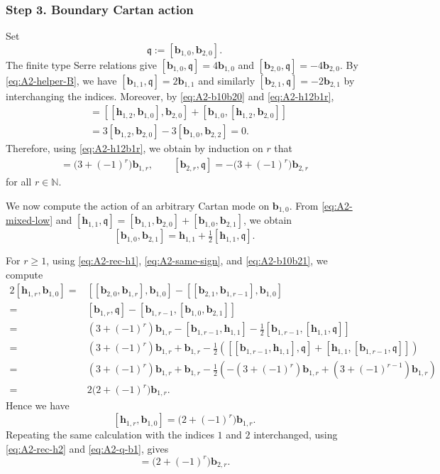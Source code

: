 \documentclass[11pt,reqno]{amsart}
\numberwithin{equation}{section}
\theoremstyle{definition}
\theoremstyle{remark}
\newcommand{\bN}{\mathbb{N}}
\newcommand{\bb}{\mathbf{b}}
\newcommand{\bh}{\mathbf{h}}
\newcommand{\gge}{\geqslant}
\begin{document}
\subsubsection*{Step 3. Boundary Cartan action} Set
\begin{equation*}
\mathfrak q:=[\bb_{1,0},\bb_{2,0}].
\end{equation*}
The finite type Serre relations give $[\bb_{1,0},\mathfrak q]=4\bb_{1,0}$ and 
$[\bb_{2,0},\mathfrak q]=-4\bb_{2,0}$.
By \eqref{eq:A2-helper-B}, we have $[\bb_{1,1},\mathfrak q]
=
2\bb_{1,1}$ and similarly $[\bb_{2,1},\mathfrak q]
=
-2\bb_{2,1}$
by interchanging the indices. Moreover, by \eqref{eq:A2-b10b20} and \eqref{eq:A2-h12b1r},
\begin{align*}
[\bh_{1,2},\mathfrak q]
&=
[[\bh_{1,2},\bb_{1,0}],\bb_{2,0}]
+
[\bb_{1,0},[\bh_{1,2},\bb_{2,0}]]
\\
&=
3[\bb_{1,2},\bb_{2,0}]
-
3[\bb_{1,0},\bb_{2,2}]
=
0.
\end{align*}
Therefore, using
\eqref{eq:A2-h12b1r}, we obtain by induction on $r$ that 
\begin{align}
[\bb_{1,r},\mathfrak q]
=
\bigl(3+(-1)^r\bigr)\bb_{1,r},
\label{eq:A2-q-b1}
\qquad 
[\bb_{2,r},\mathfrak q]
=
-\bigl(3+(-1)^r\bigr)\bb_{2,r}
\end{align}
for all $r\in\bN$. 

We now compute the action of an arbitrary Cartan mode on
$\bb_{1,0}$. From \eqref{eq:A2-mixed-low} and
$[\bh_{1,1},\mathfrak q]
=
[\bb_{1,1},\bb_{2,0}]
+
[\bb_{1,0},\bb_{2,1}]$,
we obtain
\begin{equation}\label{eq:A2-b10b21}
[\bb_{1,0},\bb_{2,1}]
=
\bh_{1,1}
+
\tfrac12[\bh_{1,1},\mathfrak q].
\end{equation}

For $r\gge1$, using \eqref{eq:A2-rec-h1},
\eqref{eq:A2-same-sign}, and
\eqref{eq:A2-b10b21}, we compute
\begin{align*}
2[\bh_{1,r},\bb_{1,0}]
={}&
[[\bb_{2,0},\bb_{1,r}],\bb_{1,0}]
-
[[\bb_{2,1},\bb_{1,r-1}],\bb_{1,0}]
\\
={}&
[\bb_{1,r},\mathfrak q]
-
[\bb_{1,r-1},[\bb_{1,0},\bb_{2,1}]]
\\
={}&
(3+(-1)^r)\bb_{1,r}
-
[\bb_{1,r-1},\bh_{1,1}]
-\tfrac12
[\bb_{1,r-1},[\bh_{1,1},\mathfrak q]]
\\
={}&
(3+(-1)^r)\bb_{1,r}
+\bb_{1,r}
-\tfrac12
\left(
[[\bb_{1,r-1},\bh_{1,1}],\mathfrak q]
+
[\bh_{1,1},[\bb_{1,r-1},\mathfrak q]]
\right)
\\
={}&
(3+(-1)^r)\bb_{1,r}
+\bb_{1,r}
-\tfrac12
\left(
-(3+(-1)^r)\bb_{1,r}
+
(3+(-1)^{r-1})\bb_{1,r}
\right)
\\
={}&
2\bigl(2+(-1)^r\bigr)\bb_{1,r}.
\end{align*}
Hence we have
\begin{equation}\label{eq:A2-hm-b10}
[\bh_{1,r},\bb_{1,0}]
=
\bigl(2+(-1)^r\bigr)\bb_{1,r}.
\end{equation}
Repeating the same calculation with the indices $1$ and $2$
interchanged, using \eqref{eq:A2-rec-h2} and
\eqref{eq:A2-q-b1}, gives
\begin{equation*}
[\bh_{2,r},\bb_{2,0}]
=
\bigl(2+(-1)^r\bigr)\bb_{2,r}.
\end{equation*}
\end{document}
